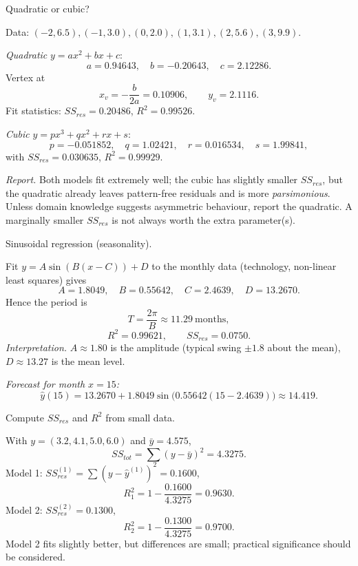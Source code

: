 \documentclass[11pt]{article}
\def\textbf#1{#1}%
\def\mathrm#1{#1}%
\begin{document}
\begin{solution}
\textbf{Quadratic or cubic?}

Data: $(-2,6.5),(-1,3.0),(0,2.0),(1,3.1),(2,5.6),(3,9.9)$.

\emph{Quadratic} $y=ax^2+bx+c$:
\[
a=0.94643,\quad b=-0.20643,\quad c=2.12286.
\]
Vertex at
\[
x_v=-\frac{b}{2a}=0.10906,\qquad y_v=2.1116.
\]
Fit statistics: $SS_{\mathrm{res}}=0.20486$, $R^2=0.99526$.

\emph{Cubic} $y=px^3+qx^2+rx+s$:
\[
p=-0.051852,\quad q=1.02421,\quad r=0.016534,\quad s=1.99841,
\]
with $SS_{\mathrm{res}}=0.030635$, $R^2=0.99929$.

\emph{Report.} Both models fit extremely well; the cubic has slightly smaller $SS_{\mathrm{res}}$, but the quadratic already leaves pattern-free residuals and is more \emph{parsimonious}. Unless domain knowledge suggests asymmetric behaviour, report the \textbf{quadratic}. A marginally smaller $SS_{\mathrm{res}}$ is not always worth the extra parameter(s).
\end{solution}

\begin{solution}
\textbf{Sinusoidal regression (seasonality).}

Fit $y=A\sin(B(x-C))+D$ to the monthly data (technology, non-linear least squares) gives
\[
A=1.8049,\quad B=0.55642,\quad C=2.4639,\quad D=13.2670.
\]
Hence the period is
\[
T=\frac{2\pi}{B}\approx \boxed{11.29\ \text{months}},
\]
\[
R^2=0.99621,\qquad SS_{\mathrm{res}}=0.0750.
\]
\emph{Interpretation.} $A\approx1.80$ is the amplitude (typical swing $\pm1.8$ about the mean),
$D\approx13.27$ is the mean level.

\emph{Forecast for month $x=15$:}
\[
\hat y(15)=13.2670+1.8049\sin\!\big(0.55642(15-2.4639)\big)\approx \boxed{14.419}.
\]
\end{solution}

\begin{solution}
\textbf{Compute $SS_{\mathrm{res}}$ and $R^2$ from small data.}

With $y=(3.2,4.1,5.0,6.0)$ and $\bar y=4.575$,
\[
SS_{\mathrm{tot}}=\sum (y-\bar y)^2=4.3275.
\]
Model 1: $SS_{\mathrm{res}}^{(1)}=\sum (y-\hat y^{(1)})^2=0.1600$,
\[
R_1^2=1-\frac{0.1600}{4.3275}= \boxed{0.9630}.
\]
Model 2: $SS_{\mathrm{res}}^{(2)}=0.1300$,
\[
R_2^2=1-\frac{0.1300}{4.3275}= \boxed{0.9700}.
\]
Model 2 fits slightly better, but differences are small; practical significance should be considered.
\end{solution}
\end{document}
